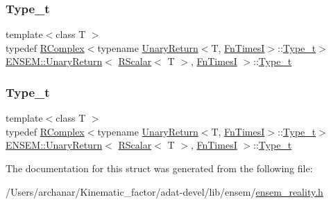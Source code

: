 \subsubsection{\texorpdfstring{Type\_t}{Type\_t}\hspace{0.1cm}{\footnotesize\ttfamily [2/3]}}
{\footnotesize\ttfamily template$<$class T $>$ \\
typedef \mbox{\hyperlink{classENSEM_1_1RComplex}{R\+Complex}}$<$typename \mbox{\hyperlink{structENSEM_1_1UnaryReturn}{Unary\+Return}}$<$T, \mbox{\hyperlink{structENSEM_1_1FnTimesI}{Fn\+TimesI}}$>$\+::\mbox{\hyperlink{structENSEM_1_1UnaryReturn_3_01RScalar_3_01T_01_4_00_01FnTimesI_01_4_ab4ba902ca0b5815b1d94723d80d0b878}{Type\+\_\+t}}$>$ \mbox{\hyperlink{structENSEM_1_1UnaryReturn}{E\+N\+S\+E\+M\+::\+Unary\+Return}}$<$ \mbox{\hyperlink{classENSEM_1_1RScalar}{R\+Scalar}}$<$ T $>$, \mbox{\hyperlink{structENSEM_1_1FnTimesI}{Fn\+TimesI}} $>$\+::\mbox{\hyperlink{structENSEM_1_1UnaryReturn_3_01RScalar_3_01T_01_4_00_01FnTimesI_01_4_ab4ba902ca0b5815b1d94723d80d0b878}{Type\+\_\+t}}}

\mbox{\label{structENSEM_1_1UnaryReturn_3_01RScalar_3_01T_01_4_00_01FnTimesI_01_4_ab4ba902ca0b5815b1d94723d80d0b878}} 
\subsubsection{\texorpdfstring{Type\_t}{Type\_t}\hspace{0.1cm}{\footnotesize\ttfamily [3/3]}}
{\footnotesize\ttfamily template$<$class T $>$ \\
typedef \mbox{\hyperlink{classENSEM_1_1RComplex}{R\+Complex}}$<$typename \mbox{\hyperlink{structENSEM_1_1UnaryReturn}{Unary\+Return}}$<$T, \mbox{\hyperlink{structENSEM_1_1FnTimesI}{Fn\+TimesI}}$>$\+::\mbox{\hyperlink{structENSEM_1_1UnaryReturn_3_01RScalar_3_01T_01_4_00_01FnTimesI_01_4_ab4ba902ca0b5815b1d94723d80d0b878}{Type\+\_\+t}}$>$ \mbox{\hyperlink{structENSEM_1_1UnaryReturn}{E\+N\+S\+E\+M\+::\+Unary\+Return}}$<$ \mbox{\hyperlink{classENSEM_1_1RScalar}{R\+Scalar}}$<$ T $>$, \mbox{\hyperlink{structENSEM_1_1FnTimesI}{Fn\+TimesI}} $>$\+::\mbox{\hyperlink{structENSEM_1_1UnaryReturn_3_01RScalar_3_01T_01_4_00_01FnTimesI_01_4_ab4ba902ca0b5815b1d94723d80d0b878}{Type\+\_\+t}}}



The documentation for this struct was generated from the following file\+:\begin{DoxyCompactItemize}
\item 
/\+Users/archanar/\+Kinematic\+\_\+factor/adat-\/devel/lib/ensem/\mbox{\hyperlink{adat-devel_2lib_2ensem_2ensem__reality_8h}{ensem\+\_\+reality.\+h}}\end{DoxyCompactItemize}
